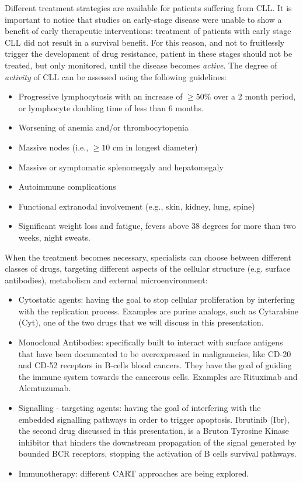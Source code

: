 \vspace{0.4cm}
Different treatment strategies are available for patients suffering from CLL. It is important to notice that studies on early-stage disease were unable to show a benefit of early therapeutic interventions: treatment of patients with early stage CLL did not result in a survival benefit. For this reason, and not to fruitlessly trigger the development of drug resistance, patient in these stages should not be treated, but only monitored, until the disease becomes \textit{active}. The degree of \textit{activity} of CLL can be assessed using the following guidelines:
\begin{itemize}
    \item Progressive lymphocytosis with an increase of $\geq 50 \%$ over a 2 month period, or lymphocyte doubling time of less than 6 months.
    \item Worsening of anemia and/or thrombocytopenia
    \item Massive nodes (i.e., $\geq 10$ cm in longest diameter)
    \item Massive or symptomatic splenomegaly and hepatomegaly
    \item Autoimmune complications
    \item Functional extranodal involvement (e.g., skin, kidney, lung, spine)
    \item Significant weight loss and fatigue, fevers above 38 degrees for more than two weeks, night sweats. 
\end{itemize}
When the treatment becomes necessary, specialists can choose between different classes of drugs, targeting different aspects of the cellular structure (e.g. surface antibodies), metabolism and external microenvironment:
\begin{itemize}
\item Cytostatic agents: having the goal to stop cellular proliferation by interfering with the replication process. Examples are purine analogs, such as Cytarabine (Cyt), one of the two drugs that we will discuss in this presentation.
\item Monoclonal Antibodies: specifically built to interact with surface antigens that have been documented to be overexpressed in malignancies, like CD-20 and CD-52 receptors in B-cells blood cancers. They have the goal of guiding the immune system towards the cancerous cells. Examples are Rituximab and Alemtuzumab.
\item Signalling - targeting agents: having the goal of interfering with the embedded signalling pathways in order to trigger apoptosis. Ibrutinib (Ibr), the second drug discussed in this presentation, is a Bruton Tyrosine Kinase inhibitor that hinders the downstream propagation of the signal generated by bounded BCR receptors, stopping the activation of B cells survival pathways. 
\item Immunotherapy: different CART approaches are being explored.
\end{itemize}

